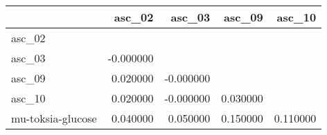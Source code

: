 \begin{tabular}{lrrrr}
\toprule
 & asc_02 & asc_03 & asc_09 & asc_10 \\
\midrule
asc_02 &  &  &  &  \\
asc_03 & -0.000000 &  &  &  \\
asc_09 & 0.020000 & -0.000000 &  &  \\
asc_10 & 0.020000 & -0.000000 & 0.030000 &  \\
mu-toksia-glucose & 0.040000 & 0.050000 & 0.150000 & 0.110000 \\
\bottomrule
\end{tabular}

